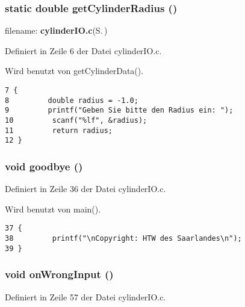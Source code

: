 \subsubsection{\setlength{\rightskip}{0pt plus 5cm}static double get\-Cylinder\-Radius ()\hspace{0.3cm}{\tt  [static]}}\label{cylinder_i_o_8c_9fc989da911ad0ede3644d16b086f4fc}


filename: {\bf cylinder\-IO.c}{\rm (S.\,\pageref{cylinder_i_o_8c})} 

Definiert in Zeile 6 der Datei cylinder\-IO.c.

Wird benutzt von get\-Cylinder\-Data().

\footnotesize\begin{verbatim}7 {
8         double radius = -1.0; 
9         printf("Geben Sie bitte den Radius ein: "); 
10         scanf("%lf", &radius);
11         return radius;
12 }
\end{verbatim}\normalsize 


\subsubsection{\setlength{\rightskip}{0pt plus 5cm}void goodbye ()}\label{cylinder_i_o_8c_9d02e3c6092fbd61a94d4bda90de3fc5}




Definiert in Zeile 36 der Datei cylinder\-IO.c.

Wird benutzt von main().

\footnotesize\begin{verbatim}37 {
38         printf("\nCopyright: HTW des Saarlandes\n");
39 }
\end{verbatim}\normalsize 


\subsubsection{\setlength{\rightskip}{0pt plus 5cm}void on\-Wrong\-Input ()}\label{cylinder_i_o_8c_ac5129efd394503c2590d23da2c37561}




Definiert in Zeile 57 der Datei cylinder\-IO.c.


